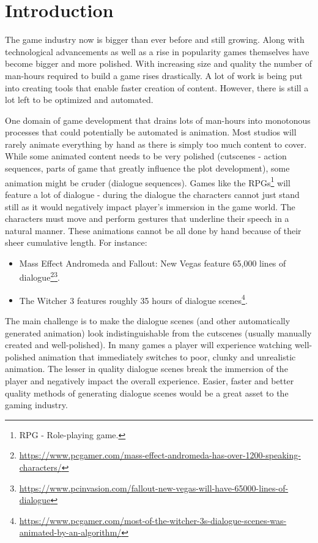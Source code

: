 \chapter{Introduction\label{chap:introduction}}

The game industry now is bigger than ever before and still growing. Along with technological advancements as well as a rise in popularity games themselves have become bigger and more polished. With increasing size and quality the number of man-hours required to build a game rises drastically. A lot of work is being put into creating tools that enable faster creation of content. However, there is still a lot left to be optimized and automated.

One domain of game development that drains lots of man-hours into monotonous processes that could potentially be automated is animation. Most studios will rarely animate everything by hand as there is simply too much content to cover. While some animated content needs to be very polished (cutscenes - action sequences, parts of game that greatly influence the plot development), some animation might be cruder (dialogue sequences). Games like the RPGs\footnote{RPG - Role-playing game.} will feature a lot of dialogue - during the dialogue the characters cannot just stand still as it would negatively impact player's immersion in the game world. The characters must move and perform gestures that underline their speech in a natural manner. These animations cannot be all done by hand because of their sheer cumulative length. For instance:

\begin{itemize}
	\item Mass Effect Andromeda and Fallout:  New Vegas feature 65,000 lines of dialogue\footnote{\url{https://www.pcgamer.com/mass-effect-andromeda-has-over-1200-speaking-characters/}}\footnote{\url{https://www.pcinvasion.com/fallout-new-vegas-will-have-65000-lines-of-dialogue}}.
	
	\item The Witcher 3 features roughly 35 hours of dialogue scenes\footnote{\url{https://www.pcgamer.com/most-of-the-witcher-3s-dialogue-scenes-was-animated-by-an-algorithm/}}.
	
\end{itemize}

The main challenge is to make the dialogue scenes (and other automatically generated animation) look indistinguishable from the cutscenes (usually manually created and well-polished). In many games a player will experience watching well-polished animation that immediately switches to poor, clunky and unrealistic animation. The lesser in quality dialogue scenes break the immersion of the player and negatively impact the overall experience. Easier, faster and better quality methods of generating dialogue scenes would be a great asset to the gaming industry.

